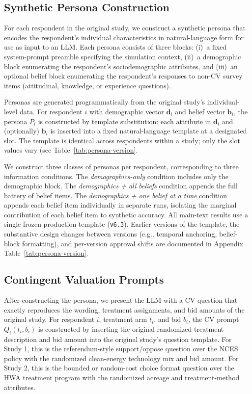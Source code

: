 \documentclass[12pt]{article}
\begin{document}
\subsection{Synthetic Persona Construction}\label{sec:methods-persona}

For each respondent in the original study, we construct a synthetic persona
that encodes the respondent's individual characteristics in natural-language
form for use as input to an LLM. Each persona consists of three blocks:
(i)~a fixed system-prompt preamble specifying the simulation context,
(ii)~a demographic block enumerating the respondent's sociodemographic
attributes, and (iii)~an optional belief block enumerating the respondent's
responses to non-CV survey items (attitudinal, knowledge, or experience
questions).

Personas are generated programmatically from the original study's
individual-level data. For respondent $i$ with demographic vector
$\mathbf{d}_i$ and belief vector $\mathbf{b}_i$, the persona $P_i$ is
constructed by template substitution: each attribute in $\mathbf{d}_i$ and
(optionally) $\mathbf{b}_i$ is inserted into a fixed natural-language
template at a designated slot. The template is identical across respondents
within a study; only the slot values vary (see Table~\ref{tab:persona-version}.


We construct three classes of personas per respondent, corresponding to
three information conditions. The \textit{demographics-only} condition
includes only the demographic block. The \textit{demographics + all
beliefs} condition appends the full battery of belief items. The
\textit{demographics + one belief at a time} condition appends each belief
item individually in separate runs, isolating the marginal contribution of
each belief item to synthetic accuracy. 
All main-text results use a single frozen production template (\texttt{v6.3}). Earlier versions of the template, the substantive design changes between versions (e.g., temporal anchoring, belief-block formatting), and per-version approval shifts are documented in Appendix Table~\ref{tab:persona-version}.


\subsection{Contingent Valuation Prompts}\label{sec:methods-cv-prompts}

After constructing the persona, we present the LLM with a CV question that
exactly reproduces the wording, treatment assignments, and bid amounts of
the original study. For respondent $i$, treatment arm $t_i$, and bid $b_i$,
the CV prompt $Q_i(t_i, b_i)$ is constructed by inserting the original
randomized treatment description and bid amount into the original study's
question template. For Study 1, this is the referendum-style support/oppose
question over the NCES policy with the randomized clean-energy technology
mix and bid amount. For Study 2, this is the bounded or random-cost choice
format question over the HWA treatment program with the randomized acreage
and treatment-method attributes.
\end{document}
